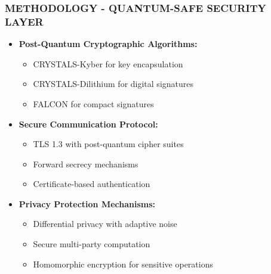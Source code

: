 \documentclass[aspectratio=169]{beamer}
\begin{document}
\begin{frame}
    \frametitle{METHODOLOGY - QUANTUM-SAFE SECURITY LAYER}
    \begin{itemize}
        \item \textbf{Post-Quantum Cryptographic Algorithms:}
        \begin{itemize}
            \item CRYSTALS-Kyber for key encapsulation
            \item CRYSTALS-Dilithium for digital signatures
            \item FALCON for compact signatures
        \end{itemize}
        
        \item \textbf{Secure Communication Protocol:}
        \begin{itemize}
            \item TLS 1.3 with post-quantum cipher suites
            \item Forward secrecy mechanisms
            \item Certificate-based authentication
        \end{itemize}
        
        \item \textbf{Privacy Protection Mechanisms:}
        \begin{itemize}
            \item Differential privacy with adaptive noise
            \item Secure multi-party computation
            \item Homomorphic encryption for sensitive operations
        \end{itemize}
    \end{itemize}
\end{frame}
\end{document}
